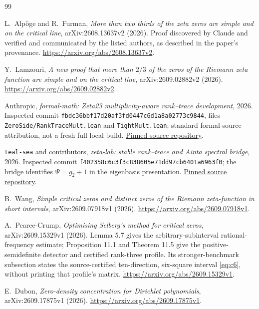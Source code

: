 ﻿\documentclass[11pt]{article}
\theoremstyle{remark}
\begin{document}
\begin{thebibliography}{99}\small\raggedright
\setlength{\itemsep}{1pt}
\setlength{\parsep}{0pt}

L.~Alp\"oge and R.~Furman,
\emph{More than two thirds of the zeta zeros are simple and on the
critical line}, arXiv:2608.13637v2 (2026).
Proof discovered by Claude and verified and communicated by the listed %
authors, as described in the paper's provenance.
\url{https://arxiv.org/abs/2608.13637v2}.

Y.~Lamzouri,
\emph{A new proof that more than $2/3$ of the zeros of the Riemann zeta
function are simple and on the critical line}, arXiv:2609.02882v2 (2026).
\url{https://arxiv.org/abs/2609.02882v2}.

Anthropic,
\emph{formal-math: Zeta23 multiplicity-aware rank--trace development},
2026. Inspected commit
\texttt{fbdc36bbf17d20af3fd0447c6d1a8a02773c9844}, files
\texttt{ZeroSide/RankTraceMult.lean} and \texttt{TightMult.lean}; standard
formal-source attribution, not a fresh full local build.
\href{https://github.com/anthropics/formal-math/tree/fbdc36bbf17d20af3fd0447c6d1a8a02773c9844}{Pinned source repository}.

\texttt{teal-sea} and contributors,
\emph{zeta-lab: stable rank--trace and Ainta spectral bridge},
2026. Inspected commit
\texttt{f402358c6c3f3c838605e71dd97cb6401a6963f0}; the bridge identifies
$\Psi=g_2+1$ in the eigenbasis presentation.
\href{https://github.com/teal-sea/zeta-lab/tree/f402358c6c3f3c838605e71dd97cb6401a6963f0}{Pinned source repository}.

B.~Wang,
\emph{Simple critical zeros and distinct zeros of the Riemann
zeta-function in short intervals}, arXiv:2609.07918v1 (2026).
\url{https://arxiv.org/abs/2609.07918v1}.

A.~Pearce-Crump,
\emph{Optimising Selberg's method for critical zeros},
arXiv:2609.15329v1 (2026). Lemma 5.7 gives the arbitrary-subinterval
rational-frequency estimate; Proposition 11.1 and Theorem 11.5 give the
positive-semidefinite detector and certified rank-three profile. Its
stronger-benchmark subsection states the source-certified ten-direction,
six-square interval \eqref{eq:c6}, without printing that profile's matrix.
\url{https://arxiv.org/abs/2609.15329v1}.

E.~Dubon,
\emph{Zero-density concentration for Dirichlet polynomials},
arXiv:2609.17875v1 (2026).
\url{https://arxiv.org/abs/2609.17875v1}.


\end{thebibliography}
\end{document}
